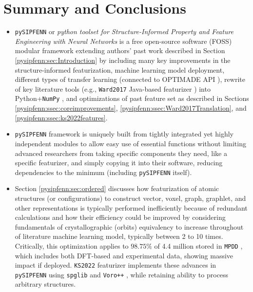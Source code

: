 \section{Summary and Conclusions} \label{pysipfenn:sec:summaryconclusions}

\begin{itemize}
    \item \texttt{pySIPFENN} or \textit{python toolset for Structure-Informed Property and Feature Engineering with Neural Networks} is a free open-source software (FOSS) modular framework extending authors' past work \cite{Krajewski2022ExtensibleNetworks} described in Section \ref{pysipfenn:sec:Introduction} by including many key improvements in the structure-informed featurization, machine learning model deployment, different types of transfer learning (connected to OPTIMADE API \cite{Evans2024DevelopmentsExchange}), rewrite of key literature tools (e.g., \texttt{Ward2017} Java-based featurizer \cite{Ward2017}) into Python+\texttt{NumPy} \cite{Harris2020ArrayNumPy}, and optimizations of past feature set as described in Sections \ref{pysipfenn:ssec:coreimprovements}, \ref{pysipfenn:ssec:Ward2017Translation}, and \ref{pysipfenn:ssec:ks2022features}.
    
    \item \texttt{pySIPFENN} framework is uniquely built from tightly integrated yet highly independent modules to allow easy use of essential functions without limiting advanced researchers from taking specific components they need, like a specific featurizer, and simply copying it into their software, reducing dependencies to the minimum (including \texttt{pySIPFENN} itself).
    
    \item Section \ref{pysipfenn:sec:ordered} discusses how featurization of atomic structures (or configurations) to construct vector, voxel, graph, graphlet, and other representations is typically performed inefficiently because of redundant calculations and how their efficiency could be improved by considering fundamentals of crystallographic (orbits) equivalency to increase throughout of literature machine learning model, typically between 2 to 10 times. Critically, this optimization applies to $98.75\%$ of 4.4 million stored in \texttt{MPDD} \cite{Krajewski2021MPDD:Database}, which includes both DFT-based \cite{Saal2013MaterialsOQMD, Kirklin2015TheEnergies, Shen2022ReflectionsOQMD, Curtarolo2013AFLOW:Discovery, Toher2018TheDiscovery, Jain2013Commentary:Innovation, Choudhary2020TheDesign, Merchant2023ScalingDiscovery} and experimental \cite{Grazulis2009CrystallographyStructures, Grazulis2012CrystallographyCollaboration, Grazulis2019CrystallographyPerspectives} data, showing massive impact if deployed. \texttt{KS2022} featurizer implements these advances in \texttt{pySIPFENN} using \texttt{spglib} \cite{Togo2018Spglib:Search} and \texttt{Voro++} \cite{Rycroft2007MultiscaleFlow, Rycroft2009Voro++:C++, Lu2023AnCells}, while retaining ability to process arbitrary structures.
    

\end{itemize}
